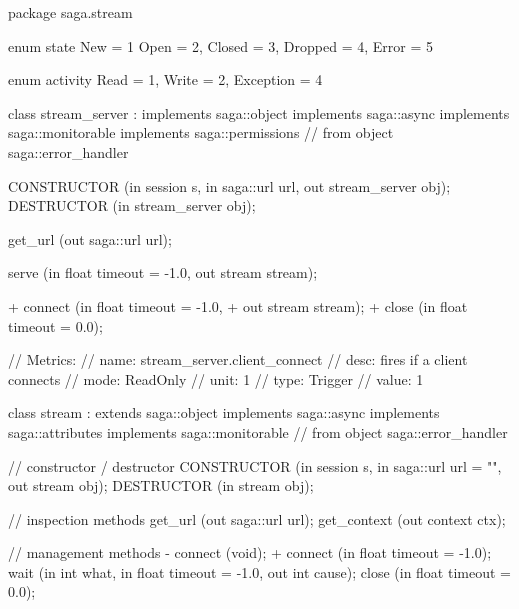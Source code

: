  \begin{myspec}
  package saga.stream
  {
    enum state
    {
      New          =  1
      Open         =  2,
      Closed       =  3,
      Dropped      =  4,
      Error        =  5
    }
 
    enum activity
    {
      Read         =  1,
      Write        =  2,
      Exception    =  4
    }
 
 
    class stream_server  : implements   saga::object
                           implements   saga::async
                           implements   saga::monitorable
                           implements   saga::permissions
                        // from object  saga::error_handler
    {
      CONSTRUCTOR       (in    session         s,
                         in    saga::url       url,
                         out   stream_server   obj);
      DESTRUCTOR        (in    stream_server   obj);
 
      get_url           (out   saga::url       url);

      serve             (in    float           timeout = -1.0,
                         out   stream          stream);
 
+     connect           (in    float           timeout = -1.0,
+                        out   stream          stream);
+
      close             (in    float           timeout = 0.0);
 
      // Metrics:
      //   name:  stream_server.client_connect
      //   desc:  fires if a client connects
      //   mode:  ReadOnly
      //   unit:  1
      //   type:  Trigger
      //   value: 1
    }
 
 
    class stream : extends      saga::object
                   implements   saga::async
                   implements   saga::attributes
                   implements   saga::monitorable
                // from object  saga::error_handler
    {
      // constructor / destructor
      CONSTRUCTOR  (in    session          s,
                    in    saga::url        url = "",
                    out   stream           obj);
      DESTRUCTOR   (in    stream           obj);
 
      // inspection methods
      get_url      (out   saga::url        url);
      get_context  (out   context          ctx);
 
      // management methods
-     connect      (void);
+     connect      (in    float            timeout = -1.0);
      wait         (in    int              what,
                    in    float            timeout = -1.0,
                    out   int              cause);
      close        (in    float            timeout = 0.0);
 
}}
\end{myspec}
